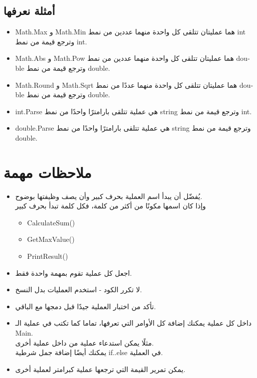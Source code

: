 \documentclass[12pt]{article}
\begin{document}
\subsection*{أمثلة نعرفها}
\begin{itemize}
    \item \textenglish{Math.Max} و \textenglish{Math.Min} هما عمليتان تتلقى كل واحدة منهما عددين من نمط \textenglish{int} وترجع قيمة من نمط \textenglish{int}.
    \item \textenglish{Math.Abs} و \textenglish{Math.Pow} هما عمليتان تتلقى كل واحدة منهما عددين من نمط \textenglish{double} وترجع قيمة من نمط \textenglish{double}.
    \item \textenglish{Math.Round} و \textenglish{Math.Sqrt} هما عمليتان تتلقى كل واحدة منهما عددًا من نمط \textenglish{double} وترجع قيمة من نمط \textenglish{double}.
    \item \textenglish{int.Parse} هي عملية تتلقى بارامترًا واحدًا من نمط \textenglish{string} وترجع قيمة من نمط \textenglish{int}.
    \item \textenglish{double.Parse} هي عملية تتلقى بارامترًا واحدًا من نمط \textenglish{string} وترجع قيمة من نمط \textenglish{double}.
\end{itemize}

\section{ملاحظات مهمة}

\begin{itemize}
\item
    يُفضّل أن يبدأ اسم العملية بحرف كبير وأن يصف وظيفتها بوضوح. \\
وإذا كان اسمها مكونًا من أكثر من كلمة، فكل كلمة تبدأ بحرف كبير
\begin{itemize}
    \item \textenglish{CalculateSum()}
    \item \textenglish{GetMaxValue()}
    \item \textenglish{PrintResult()}
\end{itemize}

\item اجعل كل عملية تقوم بمهمة واحدة فقط.
\item لا تكرر الكود - استخدم العمليات بدل النسخ.
\item تأكد من اختبار العملية جيدًا قبل دمجها مع الباقي.
\item داخل كل عملية يمكنك إضافة كل الأوامر التي تعرفها، تماما كما تكتب في عملية الـ \textenglish{Main}. \\
مثلًا يمكن استدعاء عملية من داخل عملية أخرى. \\
يمكنك أيضًا إضافة جمل شرطية \textenglish{if..else} في العملية.
\item يمكن تمرير القيمة التي ترجعها عملية كبرامتر لعملية أخرى.

\end{itemize}
\end{document}
